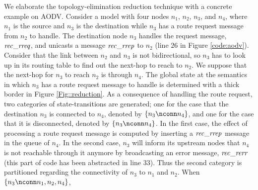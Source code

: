 We elaborate the topology-elimination reduction technique with a concrete example on AODV. Consider a model with four nodes $n_1$, $n_2$, $n_3$, and $n_4$, where $n_1$ is the source and $n_3$ is the destination while $n_3$ has a route request message from $n_2$ to handle. %
The destination node $n_3$ handles the request message, ${\it rec\_rreq}$, and unicasts a message ${\it rec\_rrep}$ to $n_2$ (line $26$ in Figure \ref{code:aodv}). Consider that the link between $n_2$ and $n_3$ is not bidirectional, so $n_3$ has to look up in its routing table to find out the next-hop to reach to $n_2$. We suppose that the next-hop for $n_3$ to reach $n_2$ is through $n_4$. The global state at the semantics in which $n_3$ has a route request message to handle is determined with a thick border in Figure \ref{Fig::reduction}. As a consequence of handling the route request, two categories of state-transitions are generated; one for the case that the destination $n_3$ is connected to $n_4$, denoted by $\{n_3\nconn n_4\}$, and one for the case that it is disconnected, denoted by $\{n_3\nconn n_4\}$. In the first case, %
the effect of processing a route request message is computed by inserting a ${\it rec\_rrep}$ message in the queue of $n_4$. In the second case, $n_3$ will inform its upstream nodes that $n_4$ is not reachable through it anymore by broadcasting an error message, ${\it rec\_rerr}$ (this part of code has been abstracted in line $33$). %
Thus the second category is partitioned regarding the connectivity of $n_3$ to $n_1$ and $n_2$. When $\{n_3\nconn n_1,n_2,n_4\}$, %
